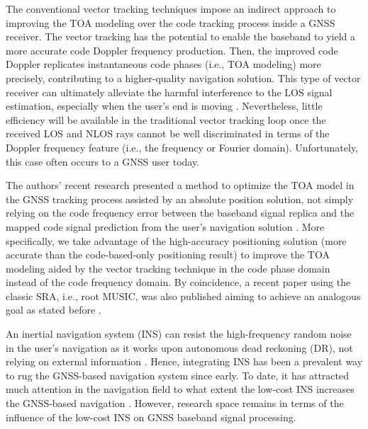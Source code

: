 \documentclass{article}
\begin{document}
The conventional vector tracking techniques impose an indirect approach to improving the TOA modeling over the code tracking process inside a GNSS receiver. The vector tracking has the potential to enable the baseband to yield a more accurate code Doppler frequency production. Then, the improved code Doppler replicates instantaneous code phases (i.e., TOA modeling) more precisely, contributing to a higher-quality navigation solution. This type of vector receiver can ultimately alleviate the harmful interference to the LOS signal estimation, especially when the user's end is moving \cite{DIetmayer2020}. Nevertheless, little efficiency will be available in the traditional vector tracking loop once the received LOS and NLOS rays cannot be well discriminated in terms of the Doppler frequency feature (i.e., the frequency or Fourier domain). Unfortunately, this case often occurs to a GNSS user today. 

The authors' recent research presented a method to optimize the TOA model in the GNSS tracking process assisted by an absolute position solution, not simply relying on the code frequency error between the baseband signal replica and the mapped code signal prediction from the user's navigation solution \cite{Luo2022aa}. More specifically, we take advantage of the high-accuracy positioning solution (more accurate than the code-based-only positioning result) to improve the TOA modeling aided by the vector tracking technique in the code phase domain instead of the code frequency domain. By coincidence, a recent paper using the classic SRA, i.e., root MUSIC, was also published aiming to achieve an analogous goal as stated before \cite{Krasner2022}. 

An inertial navigation system (INS) can resist the high-frequency random noise in the user's navigation as it works upon autonomous dead reckoning (DR), not relying on external information \cite{Groves2013}. Hence, integrating INS has been a prevalent way to rug the GNSS-based navigation system since early. To date, it has attracted much attention in the navigation field to what extent the low-cost INS increases the GNSS-based navigation \cite{Harke2022,Zhang2022}. However, research space remains in terms of the influence of the low-cost INS on GNSS baseband signal processing. 
\end{document}
